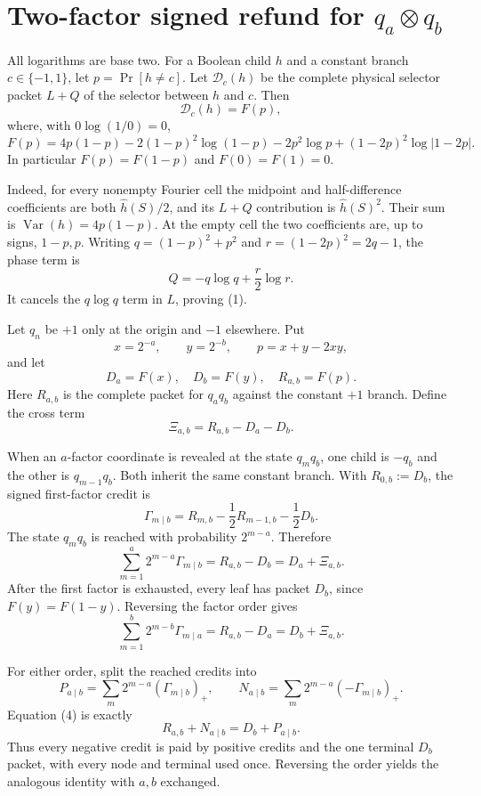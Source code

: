 \section*{Two-factor signed refund for $q_a\otimes q_b$}

All logarithms are base two.  For a Boolean child $h$ and a constant
branch $c\in\{-1,1\}$, let $p=\Pr[h\ne c]$.  Let $\mathscr D_c(h)$ be the
complete physical selector packet $L+Q$ of the selector between $h$ and
$c$.  Then
\[
 \mathscr D_c(h)=F(p),
\]
where, with $0\log(1/0)=0$,
\[
 F(p)=4p(1-p)-2(1-p)^2\log(1-p)-2p^2\log p
 +(1-2p)^2\log|1-2p|.                                      \tag{1}
\]
In particular $F(p)=F(1-p)$ and $F(0)=F(1)=0$.

Indeed, for every nonempty Fourier cell the midpoint and half-difference
coefficients are both $\widehat h(S)/2$, and its $L+Q$ contribution is
$\widehat h(S)^2$.  Their sum is $\operatorname{Var}(h)=4p(1-p)$.
At the empty cell the two coefficients are, up to signs, $1-p,p$.
Writing $q=(1-p)^2+p^2$ and $r=(1-2p)^2=2q-1$, the phase term is
\[
 Q=-q\log q+\frac r2\log r.
\]
It cancels the $q\log q$ term in $L$, proving (1).

Let $q_n$ be $+1$ only at the origin and $-1$ elsewhere.  Put
\[
 x=2^{-a},\qquad y=2^{-b},\qquad p=x+y-2xy,
\]
and let
\[
 D_a=F(x),\quad D_b=F(y),\quad R_{a,b}=F(p).
\]
Here $R_{a,b}$ is the complete packet for $q_aq_b$ against the constant
$+1$ branch.  Define the cross term
\[
 \Xi_{a,b}=R_{a,b}-D_a-D_b.                                  \tag{2}
\]

When an $a$-factor coordinate is revealed at the state $q_mq_b$, one
child is $-q_b$ and the other is $q_{m-1}q_b$.  Both inherit the same
constant branch.  With $R_{0,b}:=D_b$, the signed first-factor credit is
\[
 \Gamma_{m\mid b}=R_{m,b}-\frac12R_{m-1,b}-\frac12D_b.       \tag{3}
\]
The state $q_mq_b$ is reached with probability $2^{m-a}$.  Therefore
\[
 \boxed{\sum_{m=1}^a2^{m-a}\Gamma_{m\mid b}=R_{a,b}-D_b
 =D_a+\Xi_{a,b}.}                                             \tag{4}
\]
After the first factor is exhausted, every leaf has packet $D_b$, since
$F(y)=F(1-y)$.  Reversing the factor order gives
\[
 \boxed{\sum_{m=1}^b2^{m-b}\Gamma_{m\mid a}=R_{a,b}-D_a
 =D_b+\Xi_{a,b}.}                                             \tag{5}
\]

For either order, split the reached credits into
\[
 P_{a\mid b}=\sum_m2^{m-a}(\Gamma_{m\mid b})_+,
 \qquad
 N_{a\mid b}=\sum_m2^{m-a}(-\Gamma_{m\mid b})_+.
\]
Equation (4) is exactly
\[
 \boxed{R_{a,b}+N_{a\mid b}=D_b+P_{a\mid b}.}                \tag{6}
\]
Thus every negative credit is paid by positive credits and the one
terminal $D_b$ packet, with every node and terminal used once.  Reversing
the order yields the analogous identity with $a,b$ exchanged.

